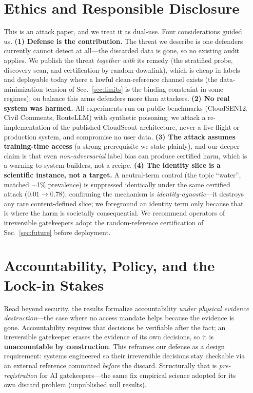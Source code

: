 \documentclass[conference]{IEEEtran}
\newif\ifgovernance \ifdefined\govbuild\governancetrue\else\governancefalse\fi
\begin{document}
\section{Ethics and Responsible Disclosure}
This is an attack paper, and we treat it as dual-use. Four considerations guided us. \textbf{(1) Defense is
the contribution.} The threat we describe is one defenders currently cannot detect at all---the discarded data
is gone, so no existing audit applies. We publish the threat \emph{together with} its remedy (the stratified
probe, discovery scan, and certification-by-random-downlink), which is cheap in labels and deployable today
where a lawful clean-reference channel exists (the data-minimization tension of Sec.~\ref{sec:limits} is the
binding constraint in some regimes); on balance this arms defenders more than attackers. \textbf{(2) No real system was harmed.} All experiments run on public
benchmarks (CloudSEN12, Civil Comments, RouteLLM) with synthetic poisoning; we attack a re-implementation of
the published CloudScout architecture, never a live flight or production system, and compromise no user data.
\textbf{(3) The attack assumes training-time access} (a strong prerequisite we state plainly), and our
deeper claim is that even \emph{non-adversarial} label bias can produce certified harm, which is a warning to
system builders, not a recipe. \textbf{(4) The identity slice is a scientific instance, not a target.} A
neutral-term control (the topic ``water'', matched $\sim$1\% prevalence) is suppressed identically under the
same certified attack ($0.01{\to}0.78$), confirming the mechanism is \emph{identity-agnostic}---it destroys any
rare content-defined slice; we foreground an identity term only because that is where the harm is societally
consequential. We recommend operators of irreversible gatekeepers adopt the random-reference certification of
Sec.~\ref{sec:future} before deployment.

\ifgovernance
\section{Accountability, Policy, and the Lock-in Stakes}
Read beyond security, the results formalize accountability \emph{under physical evidence
destruction}---the case where no access mandate helps because the evidence is gone. Accountability requires that
decisions be verifiable after the fact; an irreversible gatekeeper erases
the evidence of its own decisions, so it is \textbf{unaccountable by construction}. This reframes our defense as a design requirement:
systems engineered so their irreversible decisions stay checkable via an external reference committed
\emph{before} the discard. Structurally that is \emph{pre-registration} for AI gatekeepers---the same fix
empirical science adopted for its own discard problem (unpublished null results).
\end{document}
